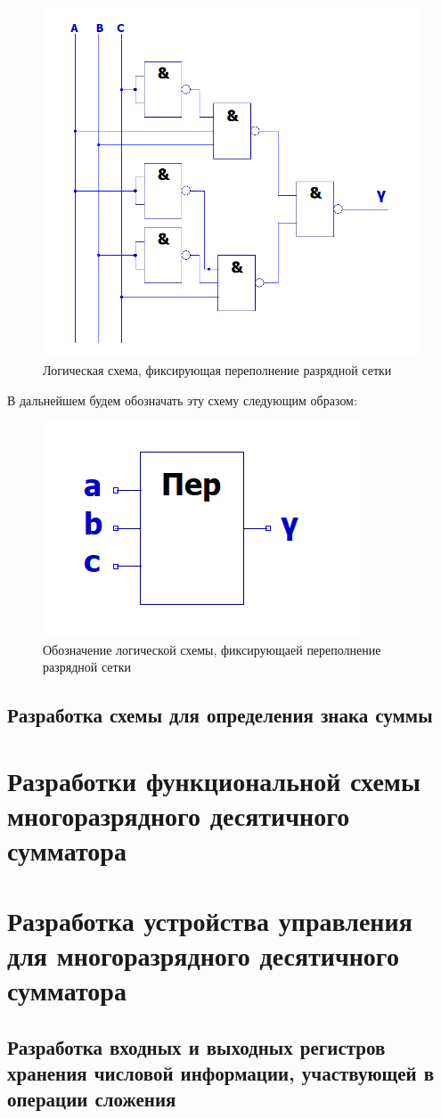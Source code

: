 \documentclass[a4paper,14pt]{article}
\begin{document}
\begin{figure}[H]
	\centering
	\includegraphics[width=0.5\linewidth]{schemas/per}
	\caption{Логическая схема, фиксирующая переполнение разрядной сетки}
	\label{fig:per}
\end{figure}

В дальнейшем будем обозначать эту схему следующим образом:

\begin{figure}[H]
	\centering
	\includegraphics[width=0.2\linewidth]{schemas/per_el}
	\caption{Обозначение логической схемы, фиксирующаей переполнение разрядной сетки}
	\label{fig:per_el}
\end{figure}

\subsection{Разработка схемы для определения знака суммы}

\section{Разработки функциональной схемы многоразрядного десятичного сумматора}

\section{Разработка устройства управления для многоразрядного десятичного сумматора}

\subsection{Разработка входных и выходных регистров хранения числовой информации, участвующей в операции сложения}
\end{document}
